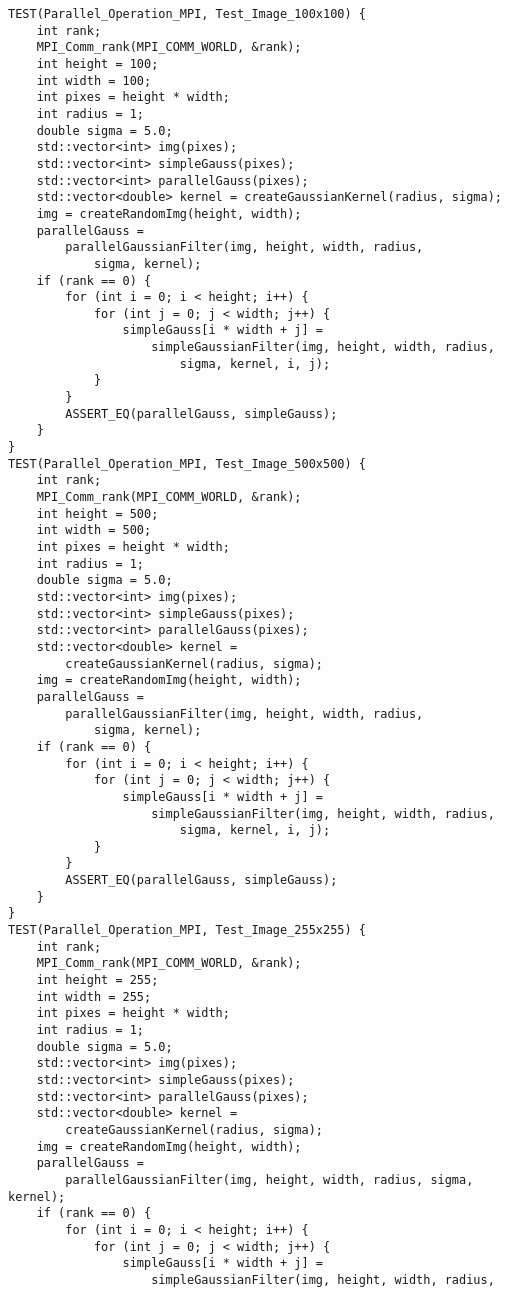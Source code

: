 \documentclass{report}
\begin{document}
\begin{lstlisting}
TEST(Parallel_Operation_MPI, Test_Image_100x100) {
    int rank;
    MPI_Comm_rank(MPI_COMM_WORLD, &rank);
    int height = 100;
    int width = 100;
    int pixes = height * width;
    int radius = 1;
    double sigma = 5.0;
    std::vector<int> img(pixes);
    std::vector<int> simpleGauss(pixes);
    std::vector<int> parallelGauss(pixes);
    std::vector<double> kernel = createGaussianKernel(radius, sigma);
    img = createRandomImg(height, width);
    parallelGauss =
        parallelGaussianFilter(img, height, width, radius,
            sigma, kernel);
    if (rank == 0) {
        for (int i = 0; i < height; i++) {
            for (int j = 0; j < width; j++) {
                simpleGauss[i * width + j] =
                    simpleGaussianFilter(img, height, width, radius,
                        sigma, kernel, i, j);
            }
        }
        ASSERT_EQ(parallelGauss, simpleGauss);
    }
}
TEST(Parallel_Operation_MPI, Test_Image_500x500) {
    int rank;
    MPI_Comm_rank(MPI_COMM_WORLD, &rank);
    int height = 500;
    int width = 500;
    int pixes = height * width;
    int radius = 1;
    double sigma = 5.0;
    std::vector<int> img(pixes);
    std::vector<int> simpleGauss(pixes);
    std::vector<int> parallelGauss(pixes);
    std::vector<double> kernel =
        createGaussianKernel(radius, sigma);
    img = createRandomImg(height, width);
    parallelGauss =
        parallelGaussianFilter(img, height, width, radius,
            sigma, kernel);
    if (rank == 0) {
        for (int i = 0; i < height; i++) {
            for (int j = 0; j < width; j++) {
                simpleGauss[i * width + j] =
                    simpleGaussianFilter(img, height, width, radius,
                        sigma, kernel, i, j);
            }
        }
        ASSERT_EQ(parallelGauss, simpleGauss);
    }
}
TEST(Parallel_Operation_MPI, Test_Image_255x255) {
    int rank;
    MPI_Comm_rank(MPI_COMM_WORLD, &rank);
    int height = 255;
    int width = 255;
    int pixes = height * width;
    int radius = 1;
    double sigma = 5.0;
    std::vector<int> img(pixes);
    std::vector<int> simpleGauss(pixes);
    std::vector<int> parallelGauss(pixes);
    std::vector<double> kernel =
        createGaussianKernel(radius, sigma);
    img = createRandomImg(height, width);
    parallelGauss =
        parallelGaussianFilter(img, height, width, radius, sigma, kernel);
    if (rank == 0) {
        for (int i = 0; i < height; i++) {
            for (int j = 0; j < width; j++) {
                simpleGauss[i * width + j] =
                    simpleGaussianFilter(img, height, width, radius,

\end{lstlisting}
\end{document}
